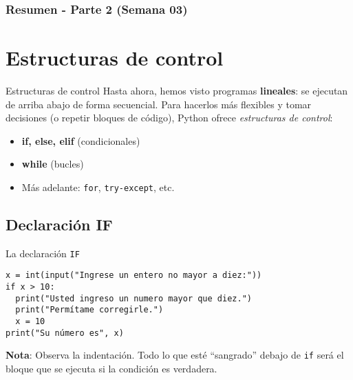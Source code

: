 \documentclass[10pt]{beamer}
\begin{document}
\myfront{}

\begin{frame}
  \titlepage
\end{frame}

\begin{frame}
  \frametitle{Resumen - Parte 2 (Semana 03)}
  \tableofcontents
\end{frame}


\section{Estructuras de control}

\begin{frame}{Estructuras de control}
Hasta ahora, hemos visto programas \textbf{lineales}: se ejecutan de arriba abajo de forma secuencial.  
Para hacerlos más flexibles y tomar decisiones (o repetir bloques de código), Python ofrece \textit{estructuras de control}:
\begin{itemize}
    \item \textbf{if, else, elif} (condicionales)
    \item \textbf{while} (bucles)
    \item Más adelante: \texttt{for}, \texttt{try-except}, etc.
\end{itemize}
\end{frame}

\subsection{Declaración IF}
\begin{frame}[fragile]{La declaración \texttt{IF}}
\begin{verbatim}
x = int(input("Ingrese un entero no mayor a diez:"))
if x > 10:
  print("Usted ingreso un numero mayor que diez.")
  print("Permítame corregirle.")
  x = 10
print("Su número es", x)
\end{verbatim}

\textbf{Nota}: Observa la indentación. Todo lo que esté “sangrado” debajo de \texttt{if} será el bloque que se ejecuta si la condición es verdadera.
\end{frame}
\end{document}
